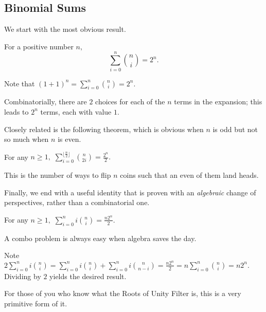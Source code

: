 \documentclass[blue,onecol]{shooting}
\begin{document}
\subsection{Binomial Sums}

We start with the most obvious result.

\begin{theo}
For a positive number $n,$
\[\sum_{i=0}^{n}\binom{n}{i}=2^n.\]
\end{theo}

\begin{pro}
Note that $(1+1)^n=\sum\limits_{i=0}^{n}\binom{n}{i}=2^n.$

Combinatorially, there are $2$ choices for each of the $n$ terms in the expansion; this leads to $2^n$ terms, each with value $1.$
\end{pro}

Closely related is the following theorem, which is obvious when $n$ is odd but not so much when $n$ is even.

\begin{exam}
For any $n\geq 1,$ $\sum\limits_{i=0}^{\lfloor\frac{n}{2}\rfloor}\binom{n}{2i}=\frac{2^n}{2}.$
\end{exam}

\begin{sol}
This is the number of ways to flip $n$ coins such that an even of them land heads.
\end{sol}

Finally, we end with a useful identity that is proven with an \textit{algebraic} change of perspectives, rather than a combinatorial one.

\begin{exam}
For any $n\geq 1,$ $\sum\limits_{i=0}^{n}i\binom{n}{i}=\frac{n2^n}{2}.$
\end{exam}

\begin{sol}
A combo problem is always easy when algebra saves the day.

Note $2\sum\limits_{i=0}^{n}i\binom{n}{i}=\sum\limits_{i=0}^{n}i\binom{n}{i}+\sum\limits_{i=0}^{n}i\binom{n}{n-i}=\frac{n2^n}{2}=n\sum\limits_{i=0}^{n}\binom{n}{i}=n2^n.$ Dividing by $2$ yields the desired result.
\end{sol}

For those of you who know what the Roots of Unity Filter is, this is a very primitive form of it.
\end{document}
